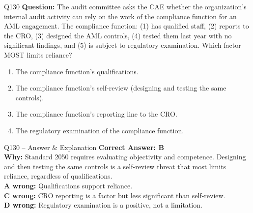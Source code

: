 \documentclass[aspectratio=169,10pt]{beamer}
\begin{document}
	\begin{frame}[t]{Q130}
		\small
		\textbf{Question:} The audit committee asks the CAE whether the organization's internal audit activity can rely on the work of the compliance function for an AML engagement. The compliance function: (1) has qualified staff, (2) reports to the CRO, (3) designed the AML controls, (4) tested them last year with no significant findings, and (5) is subject to regulatory examination. Which factor MOST limits reliance?
		\begin{enumerate}[label=\Alph*.,itemsep=1pt,topsep=2pt]
			\item The compliance function's qualifications.
			\item The compliance function's self-review (designing and testing the same controls).
			\item The compliance function's reporting line to the CRO.
			\item The regulatory examination of the compliance function.
		\end{enumerate}
	\end{frame}
	
	\begin{frame}[t]{Q130 -- Answer \& Explanation}
		\small
		\textbf{Correct Answer: B} \\[4pt]
		\textbf{Why:} Standard 2050 requires evaluating objectivity and competence. Designing and then testing the same controls is a self-review threat that most limits reliance, regardless of qualifications. \\[4pt]
		\textbf{A wrong:} Qualifications support reliance. \\[2pt]
		\textbf{C wrong:} CRO reporting is a factor but less significant than self-review. \\[2pt]
		\textbf{D wrong:} Regulatory examination is a positive, not a limitation.
	\end{frame}
	
\end{document}
